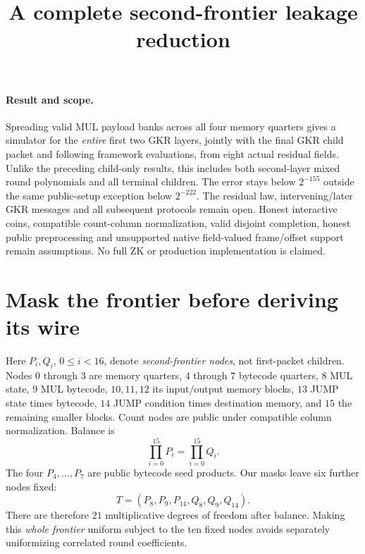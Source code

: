 \documentclass[11pt]{article}
\title{A complete second-frontier leakage reduction}
\author{}
\date{}
\begin{document}
\maketitle
\vspace{-2em}

\paragraph{Result and scope.} Spreading valid MUL payload banks across all four memory quarters gives a simulator for the \emph{entire} first two GKR layers, jointly with the final GKR child packet and following framework evaluations, from eight actual residual fields. Unlike the preceding child-only results, this includes both second-layer mixed round polynomials and all terminal children. The error stays below $2^{-155}$ outside the same public-setup exception below $2^{-222}$. The residual law, intervening/later GKR messages and all subsequent protocols remain open. Honest interactive coins, compatible count-column normalization, valid disjoint completion, honest public preprocessing and unsupported native field-valued frame/offset support remain assumptions. No full ZK or production implementation is claimed.

\section{Mask the frontier before deriving its wire}

Here $P_i,Q_i$, $0\le i<16$, denote \emph{second-frontier nodes}, not first-packet children. Nodes $0$ through $3$ are memory quarters, $4$ through $7$ bytecode quarters, $8$ MUL state, $9$ MUL bytecode, $10,11,12$ its input/output memory blocks, $13$ JUMP state times bytecode, $14$ JUMP condition times destination memory, and $15$ the remaining smaller blocks. Count nodes are public under compatible column normalization. Balance is
\[
 \prod_{i=0}^{15}P_i=\prod_{i=0}^{15}Q_i.
\]
The four $P_4,\ldots,P_7$ are public bytecode seed products. Our masks leave six further nodes fixed:
\[
 T=(P_8,P_9,P_{14},Q_8,Q_9,Q_{14}).
\]
There are therefore $21$ multiplicative degrees of freedom after balance. Making this \emph{whole frontier} uniform subject to the ten fixed nodes avoids separately uniformizing correlated round coefficients.
\end{document}
